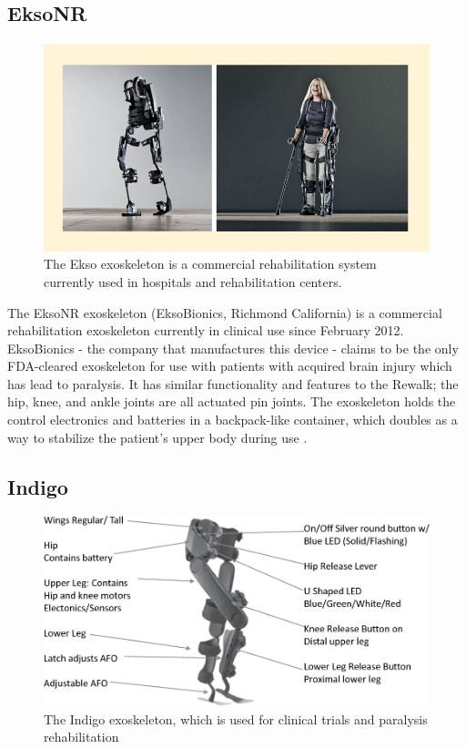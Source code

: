 \subsection{EksoNR}
\begin{figure}[H]
    \centering
    \includegraphics[width=0.9\linewidth]{Figures/Background/OtherExos/EKSO.png}
    \caption{The Ekso exoskeleton is a commercial rehabilitation system currently used in hospitals and rehabilitation centers.}
    \label{fig:EksoExo}
\end{figure}

The EksoNR exoskeleton (EksoBionics, Richmond California) is a commercial rehabilitation exoskeleton currently in clinical use since February 2012. EksoBionics - the company that manufactures this device - claims to be the only FDA-cleared exoskeleton for use with patients with acquired brain injury which has lead to paralysis. %
It has similar functionality and features to the Rewalk; the hip, knee, and ankle joints are all actuated pin joints. The exoskeleton holds the control electronics and batteries in a backpack-like container, which doubles as a way to stabilize the patient's upper body during use \cite{ExoEksoNR}.

\subsection{Indigo}
\begin{figure}[H]
    \centering
    \includegraphics[width=0.9\linewidth]{Figures/Background/OtherExos/IndigoExo.png}
    \caption{The Indigo exoskeleton, which is used for clinical trials and paralysis rehabilitation \cite{IndigoClinicalStudy}}
    \label{fig:IndigoExo}
\end{figure}


